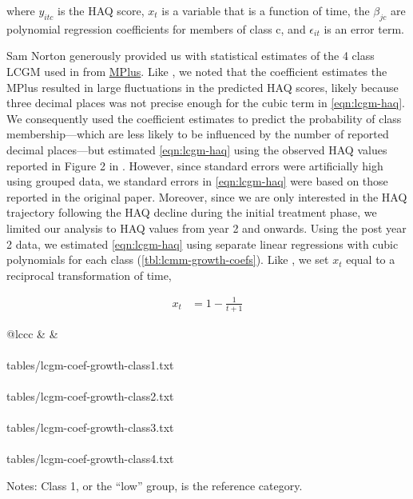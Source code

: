 \documentclass[11pt,final,fleqn]{article}
\makeatletter
\theoremstyle{plain}
\newcommand*\ExpandableInput[1]{\@@input#1 }
\makeatother
\begin{document}
\begin{appendices}
where $y_{itc}$ is the HAQ score, $x_t$ is a variable that is a function of time, the $\beta_{jc}$ are polynomial regression coefficients for members of class c, and $\epsilon_{it}$ is an error term.

Sam Norton generously provided us with statistical estimates of the 4 class LCGM used in \citet{norton2014health} from \href{https://www.statmodel.com}{MPlus}. Like \citet{stevenson2016adalimumab}, we noted that the coefficient estimates the MPlus resulted in large fluctuations in the predicted HAQ scores, likely because three decimal places was not precise enough for the cubic term in \autoref{eqn:lcgm-haq}. We consequently used the coefficient estimates to predict the probability of class membership---which are less likely to be influenced by the number of reported decimal places---but estimated \autoref{eqn:lcgm-haq} using the observed HAQ values reported in Figure 2 in \citet{norton2014health}. However, since standard errors were artificially high using grouped data, we standard errors in \autoref{eqn:lcgm-haq} were based on those reported in the original paper. Moreover, since we are only interested in the HAQ trajectory following the HAQ decline during the initial treatment phase, we limited our analysis to HAQ values from year 2 and onwards. Using the post year 2 data, we estimated \autoref{eqn:lcgm-haq} using separate linear regressions with cubic polynomials for each class (\autoref{tbl:lcmm-growth-coefs}). Like \citet{norton2014health}, we set $x_t$ equal to a reciprocal transformation of time,

\begin{align}
x_t &= 1 - \frac{1}{t+1}
\end{align}

\begin{table}[!ht] 
\begin{center}
\begin{threeparttable}
\caption{LCGM HAQ trajectory coefficients} \label{tbl:lcmm-growth-coefs}
\begin{tabularx}{\textwidth}{@{\extracolsep{\fill}}lccc}
\hline
{} &  &   \\
\hline
{} \\
\ExpandableInput{tables/lcgm-coef-growth-class1.txt} \\
 \\
\ExpandableInput{tables/lcgm-coef-growth-class2.txt} \\
 \\
\ExpandableInput{tables/lcgm-coef-growth-class3.txt} \\
 \\
\ExpandableInput{tables/lcgm-coef-growth-class4.txt}
\hline
\end{tabularx}
\scriptsize
Notes: Class 1, or the ``low'' group, is the reference category.
\end{threeparttable}
\end{center}
\end{table}


\end{appendices}
\end{document}

